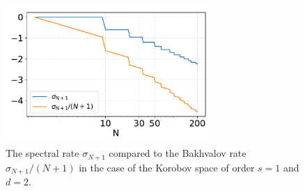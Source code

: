 \documentclass[twoside,11pt]{book}
\numberwithin{theorem}{chapter}
\numberwithin{definition}{chapter}
\numberwithin{proposition}{chapter}
\numberwithin{corollary}{chapter}
\numberwithin{example}{chapter}
\numberwithin{lemma}{chapter}
\numberwithin{assumption}{chapter}
\numberwithin{equation}{chapter}
\numberwithin{figure}{chapter}
\DeclareMathOperator{\F}{\mathcal{F}}
\begin{document}







\begin{figure}[h]
\centering
\includegraphics[width= 0.7\textwidth]{img/conclusion/Bakhvalov_for_Korobov_2D_s_1.pdf}
\caption{The spectral rate $\sigma_{N+1}$ compared to the Bakhvalov rate $\sigma_{N+1}/(N+1)$ in the case of the Korobov space of order $s=1$ and $d =2$. \label{fig:conclusion_bakhvalov_for_korobov}}
\end{figure}
\end{document}
